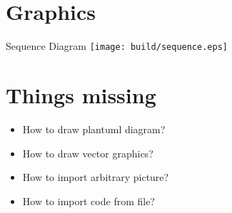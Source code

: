 \documentclass{beamer}
\begin{document}
\section{Graphics}

\begin{frame}{Sequence Diagram}
    \texttt{[image: build/sequence.eps]}
\end{frame}

\section{Things missing}

\begin{frame}
    \begin{itemize}
        \item How to draw plantuml diagram?
        \item How to draw vector graphics?
        \item How to import arbitrary picture?
        \item How to import code from file?
    \end{itemize}
\end{frame}
\end{document}
